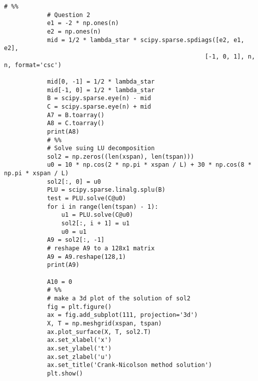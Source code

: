 \documentclass[a4paper,12pt, fleqn]{article}
\begin{document}
\begin{enumerate}
\begin{lstlisting}[basicstyle=\tiny]
            # %%
            # Question 2
            e1 = -2 * np.ones(n)
            e2 = np.ones(n)
            mid = 1/2 * lambda_star * scipy.sparse.spdiags([e2, e1, e2],
                                                        [-1, 0, 1], n, n, format='csc')
            
            mid[0, -1] = 1/2 * lambda_star
            mid[-1, 0] = 1/2 * lambda_star
            B = scipy.sparse.eye(n) - mid
            C = scipy.sparse.eye(n) + mid
            A7 = B.toarray()
            A8 = C.toarray()
            print(A8)
            # %%
            # Solve suing LU decomposition 
            sol2 = np.zeros((len(xspan), len(tspan)))
            u0 = 10 * np.cos(2 * np.pi * xspan / L) + 30 * np.cos(8 * np.pi * xspan / L)
            sol2[:, 0] = u0
            PLU = scipy.sparse.linalg.splu(B)
            test = PLU.solve(C@u0)
            for i in range(len(tspan) - 1):
                u1 = PLU.solve(C@u0)
                sol2[:, i + 1] = u1
                u0 = u1
            A9 = sol2[:, -1]
            # reshape A9 to a 128x1 matrix
            A9 = A9.reshape(128,1)
            print(A9)
            
            A10 = 0 
            # %%
            # make a 3d plot of the solution of sol2 
            fig = plt.figure()
            ax = fig.add_subplot(111, projection='3d')
            X, T = np.meshgrid(xspan, tspan)
            ax.plot_surface(X, T, sol2.T)
            ax.set_xlabel('x')
            ax.set_ylabel('t')
            ax.set_zlabel('u')
            ax.set_title('Crank-Nicolson method solution')
            plt.show()

        \end{lstlisting}

\end{enumerate}
    
\end{document}
